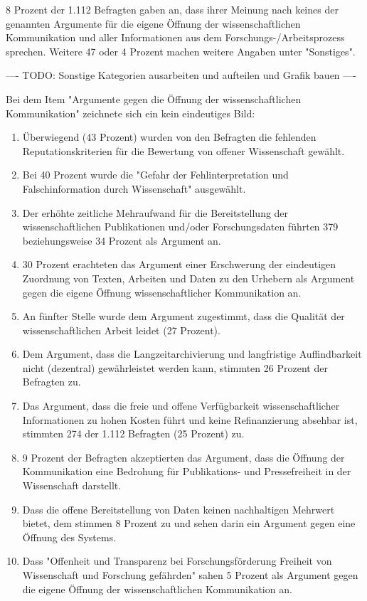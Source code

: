 8 Prozent der 1.112 Befragten gaben an, dass ihrer Meinung nach keines der genannten Argumente für die eigene Öffnung der wissenschaftlichen Kommunikation und aller Informationen aus dem Forschungs-/Arbeitsprozess sprechen. Weitere 47 oder 4 Prozent machen weitere Angaben unter "Sonstiges".

---- TODO: Sonstige Kategorien ausarbeiten und aufteilen und Grafik bauen ----

Bei dem Item "Argumente gegen die Öffnung der wissenschaftlichen Kommunikation" zeichnete sich ein kein eindeutiges Bild:
\begin{enumerate}
\item Überwiegend (43 Prozent) wurden von den Befragten die fehlenden Reputationskriterien für die Bewertung von offener Wissenschaft gewählt.
\item Bei 40 Prozent wurde die "Gefahr der Fehlinterpretation und Falschinformation durch Wissenschaft" ausgewählt.
\item Der erhöhte zeitliche Mehraufwand für die Bereitstellung der wissenschaftlichen Publikationen und/oder Forschungsdaten führten 379 beziehungsweise 34 Prozent als Argument an.
\item 30 Prozent erachteten das Argument einer Erschwerung der eindeutigen Zuordnung von Texten, Arbeiten und Daten zu den Urhebern als Argument gegen die eigene Öffnung wissenschaftlicher Kommunikation an.
\item An fünfter Stelle wurde dem Argument zugestimmt, dass die Qualität der wissenschaftlichen Arbeit leidet (27 Prozent).
\item Dem Argument, dass die Langzeitarchivierung und langfristige Auffindbarkeit nicht (dezentral) gewährleistet werden kann, stimmten 26 Prozent der Befragten zu.
\item Das Argument, dass die freie und offene Verfügbarkeit wissenschaftlicher Informationen zu hohen Kosten führt und keine Refinanzierung absehbar ist, stimmten 274 der 1.112 Befragten (25 Prozent) zu.
\item 9 Prozent der Befragten akzeptierten das Argument, dass die Öffnung der Kommunikation eine Bedrohung für Publikations- und Pressefreiheit in der Wissenschaft darstellt.
\item Dass die offene Bereitstellung von Daten keinen nachhaltigen Mehrwert bietet, dem stimmen 8 Prozent zu und sehen darin ein Argument gegen eine Öffnung des Systems.
\item Dass "Offenheit und Transparenz bei Forschungsförderung Freiheit von Wissenschaft und Forschung gefährden" sahen 5 Prozent als Argument gegen die eigene Öffnung der wissenschaftlichen Kommunikation an.
\end{enumerate}

